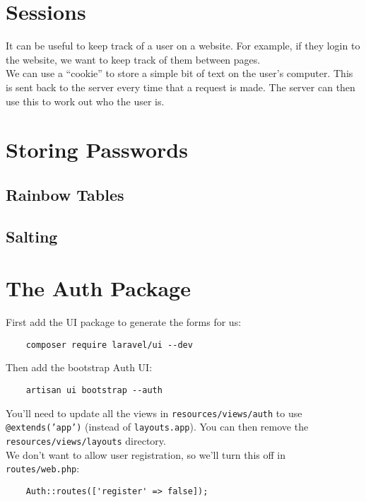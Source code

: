 \section{Sessions}

It can be useful to keep track of a user on a website. For example, if they login to the website, we want to keep track of them between pages.
\\

We can use a ``cookie'' to store a simple bit of text on the user's computer. This is sent back to the server every time that a request is made. The server can then use this to work out who the user is.


\section{Storing Passwords}

\subsection{Rainbow Tables}

\subsection{Salting}

\section{The Auth Package}

First add the UI package to generate the forms for us:

\begin{verbatim}
    composer require laravel/ui --dev
\end{verbatim}

Then add the bootstrap Auth UI:

\begin{verbatim}
    artisan ui bootstrap --auth
\end{verbatim}

You'll need to update all the views in \texttt{resources/views/auth} to use \texttt{@extends('app')} (instead of \texttt{layouts.app}). You can then remove the \texttt{resources/views/layouts} directory.
\\

We don't want to allow user registration, so we'll turn this off in \texttt{routes/web.php}:

\begin{verbatim}
    Auth::routes(['register' => false]);
\end{verbatim}
